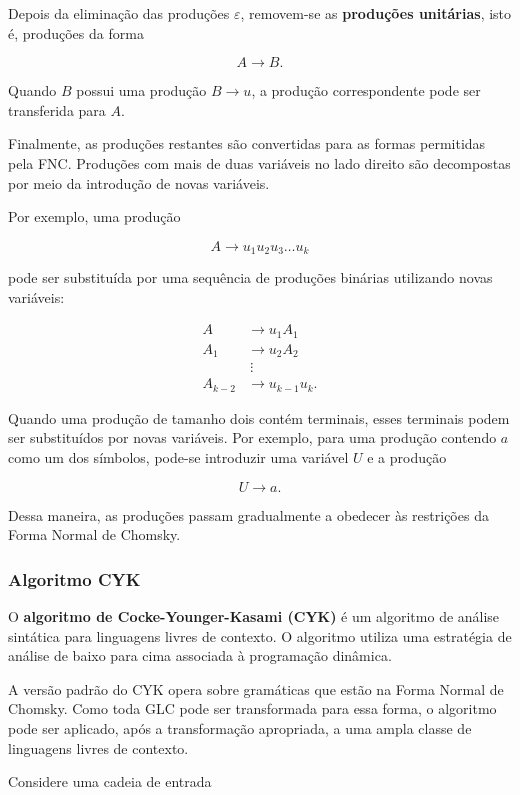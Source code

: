 \documentclass[
  brazilian,
  letterpaper,
]{book}
\theoremstyle{plain}
\theoremstyle{definition}
\theoremstyle{remark}
\begin{document}
Depois da eliminação das produções \(\varepsilon\), removem-se as
\textbf{produções unitárias}, isto é, produções da forma

\[
A\rightarrow B.
\]

Quando \(B\) possui uma produção \(B\rightarrow u\), a produção
correspondente pode ser transferida para \(A\).

Finalmente, as produções restantes são convertidas para as formas
permitidas pela FNC. Produções com mais de duas variáveis no lado
direito são decompostas por meio da introdução de novas variáveis.

Por exemplo, uma produção

\[
A\rightarrow u_1u_2u_3\ldots u_k
\]

pode ser substituída por uma sequência de produções binárias utilizando
novas variáveis:

\[
\begin{aligned}
A&\rightarrow u_1A_1\\
A_1&\rightarrow u_2A_2\\
&\ \vdots\\
A_{k-2}&\rightarrow u_{k-1}u_k.
\end{aligned}
\]

Quando uma produção de tamanho dois contém terminais, esses terminais
podem ser substituídos por novas variáveis. Por exemplo, para uma
produção contendo \(a\) como um dos símbolos, pode-se introduzir uma
variável \(U\) e a produção

\[
U\rightarrow a.
\]

Dessa maneira, as produções passam gradualmente a obedecer às restrições
da Forma Normal de Chomsky.

\subsubsection{Algoritmo CYK}\label{algoritmo-cyk}

O \textbf{algoritmo de Cocke-Younger-Kasami (CYK)} é um algoritmo de
análise sintática para linguagens livres de contexto. O algoritmo
utiliza uma estratégia de análise de baixo para cima associada à
programação dinâmica.

A versão padrão do CYK opera sobre gramáticas que estão na Forma Normal
de Chomsky. Como toda GLC pode ser transformada para essa forma, o
algoritmo pode ser aplicado, após a transformação apropriada, a uma
ampla classe de linguagens livres de contexto.

Considere uma cadeia de entrada
\end{document}
